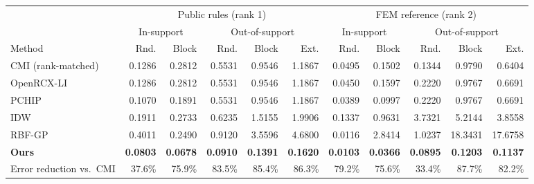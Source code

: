 \scriptsize
\setlength{\tabcolsep}{2.2pt}
\begin{tabular*}{\linewidth}{@{\extracolsep{\fill}}lrrrrrrrrrr@{}}\toprule
 & \multicolumn{5}{c}{Public rules (rank 1)} & \multicolumn{5}{c}{FEM reference (rank 2)} \\
\cmidrule(lr){2-6}\cmidrule(lr){7-11}
 & \multicolumn{2}{c}{In-support} & \multicolumn{3}{c}{Out-of-support} & \multicolumn{2}{c}{In-support} & \multicolumn{3}{c}{Out-of-support} \\
\cmidrule(lr){2-3}\cmidrule(lr){4-6}\cmidrule(lr){7-8}\cmidrule(lr){9-11}
Method & Rnd. & Block & Rnd. & Block & Ext. & Rnd. & Block & Rnd. & Block & Ext. \\
\midrule
CMI (rank-matched) & 0.1286 & 0.2812 & 0.5531 & 0.9546 & 1.1867 & 0.0495 & 0.1502 & 0.1344 & 0.9790 & 0.6404 \\
OpenRCX-LI & 0.1286 & 0.2812 & 0.5531 & 0.9546 & 1.1867 & 0.0450 & 0.1597 & 0.2220 & 0.9767 & 0.6691 \\
PCHIP & 0.1070 & 0.1891 & 0.5531 & 0.9546 & 1.1867 & 0.0389 & 0.0997 & 0.2220 & 0.9767 & 0.6691 \\
IDW & 0.1911 & 0.2733 & 0.6235 & 1.5155 & 1.9906 & 0.1337 & 0.9631 & 3.7321 & 5.2144 & 3.8558 \\
RBF-GP & 0.4011 & 0.2490 & 0.9120 & 3.5596 & 4.6800 & 0.0116 & 2.8414 & 1.0237 & 18.3431 & 17.6758 \\
\midrule
\textbf{Ours} & \textbf{0.0803} & \textbf{0.0678} & \textbf{0.0910} & \textbf{0.1391} & \textbf{0.1620} & \textbf{0.0103} & \textbf{0.0366} & \textbf{0.0895} & \textbf{0.1203} & \textbf{0.1137} \\
\midrule
Error reduction vs.\ CMI & 37.6\% & 75.9\% & 83.5\% & 85.4\% & 86.3\% & 79.2\% & 75.6\% & 33.4\% & 87.7\% & 82.2\% \\
\bottomrule\end{tabular*}
